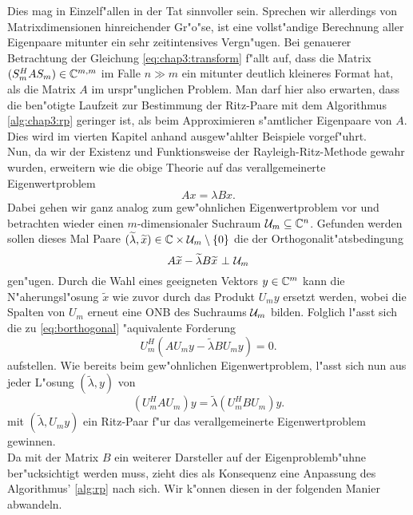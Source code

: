Dies mag in Einzelf"allen in der Tat sinnvoller sein. Sprechen wir allerdings
von Matrixdimensionen hinreichender Gr"o"se, ist eine vollst"andige
Berechnung aller Eigenpaare mitunter ein sehr zeitintensives Vergn"ugen. Bei
genauerer Betrachtung der Gleichung \eqref{eq:chap3:transform} f"allt auf, dass die
Matrix $(S_m^H A S_m) \in \mathbb{C}^{m,m}$ im Falle $n \gg m$ ein mitunter deutlich kleineres
Format hat, als die Matrix $A$ im urspr"unglichen Problem. Man darf hier also erwarten,
dass die ben"otigte Laufzeit zur Bestimmung der Ritz-Paare mit dem Algorithmus \ref{alg:chap3:rp}
geringer ist, als beim Approximieren s"amtlicher Eigenpaare von $A$. Dies
wird im vierten Kapitel anhand ausgew"ahlter Beispiele vorgef"uhrt.\\

Nun, da wir der Existenz und Funktionsweise der Rayleigh-Ritz-Methode gewahr wurden, erweitern wie die obige Theorie auf das
verallgemeinerte Eigenwertproblem
\begin{equation}\label{chap2:gevp}
Ax = \lambda Bx.
\end{equation}
Dabei gehen wir ganz analog zum gew"ohnlichen Eigenwertproblem vor und betrachten wieder
einen $m$-dimensionaler Suchraum $\mathcal{U}_m\subseteq \mathbb{C}^n$.
Gefunden werden sollen dieses Mal Paare $ (\widetilde{\lambda}, \widetilde{x}) \in \mathbb{C}
\times \mathcal{U}_m \setminus\{ 0\}$ die der Orthogonalit"atsbedingung
\begin{equation}\label{eq:borthogonal}
A\widetilde{x} - \widetilde{\lambda}B\widetilde{x} \ \bot \ \U_m
\end{equation}
gen"ugen. Durch die Wahl eines geeigneten Vektors $y\in\mathbb{C}^m$ kann die N"aherungsl"osung $\widetilde{x}$ wie zuvor durch das Produkt $U_m y$ ersetzt werden, wobei die Spalten von $U_m$ erneut eine ONB des Suchraums $\mathcal{U}_m$ bilden. Folglich l"asst sich die zu \eqref{eq:borthogonal} "aquivalente Forderung
\[
U_m^H(AU_m y - \widetilde{\lambda} BU_m y) = 0.
\]
aufstellen. Wie bereits beim gew"ohnlichen Eigenwertproblem, l"asst sich nun aus jeder L"osung
$(\widetilde{\lambda}, y)$ von
\begin{equation}\label{eq:transformedevp}
(U_m^H AU_m) y = \widetilde{\lambda} (U_m^H B U_m) y.
\end{equation}
mit $(\widetilde{\lambda}, U_m y)$ ein Ritz-Paar f"ur das verallgemeinerte Eigenwertproblem
gewinnen.\\

Da mit der Matrix $B$ ein weiterer Darsteller auf der Eigenproblemb"uhne ber"ucksichtigt werden muss, zieht dies als Konsequenz eine Anpassung des Algorithmus' \ref{alg:rp} nach sich. Wir k"onnen diesen in der folgenden Manier abwandeln.

